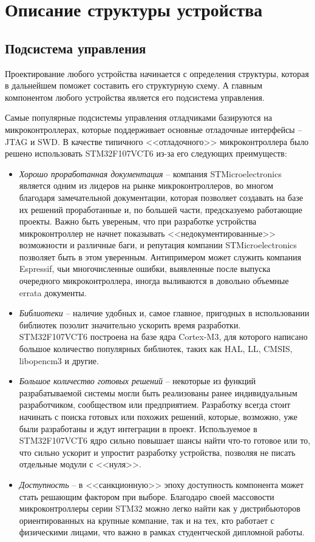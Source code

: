 
\chapter{Описание структуры устройства}
\section{Подсистема управления}
\hspace{1cm} 

Проектирование любого устройства начинается с определения структуры, которая в дальнейшем
поможет составить его структурную схему. А главным компонентом любого устройства является
его подсистема управления.

Самые популярные подсистемы управления отладчиками базируются на микроконтроллерах,
которые поддерживает основные отладочные интерфейсы -- JTAG и SWD.
В качестве типичного <<отладочного>> микроконтроллера было решено использовать
STM32F107VCT6 из-за его следующих преимуществ:

\begin{itemize}
    \item \textit{Хорошо проработанная документация} -- компания
     STMicroelectronics является одним из лидеров на рынке микроконтроллеров, во многом благодаря
     замечательной документации, которая позволяет создавать на базе их решений проработанные
     и, по большей части, предсказуемо работающие проекты. Важно быть увереным, что при разработке
     устройства микроконтроллер не начнет показывать <<недокументированные>> возможности и
     различные баги, и репутация компании STMicroelectronics позволяет быть в этом
     уверенным. Антипримером может служить компания Espressif, чьи многочисленные ошибки,
     выявленные после выпуска очередного микроконтроллера, иногда выливаются в довольно
     объемные errata документы.
    \item \textit{Библиотеки} -- наличие удобных и, самое главное, пригодных в использовании 
     библиотек позолит значительно ускорить время разработки. STM32F107VCT6 построена на базе
     ядра Cortex-M3, для которого написано большое количество популярных библиотек, таких
     как HAL, LL, CMSIS, libopencm3 и другие.
    \item \textit{Большое количество готовых решений} -- некоторые из функций разрабатываемой
     системы могли быть реализованы ранее индивидуальным разработчиком, 
     сообществом или предприятием. Разработку всегда стоит начинать с поиска готовых или похожих 
     решений, которые, возможно, уже были разработаны и ждут интеграции в проект. Используемое
     в STM32F107VCT6 ядро сильно повышает шансы найти что-то готовое или то, что сильно 
     ускорит и упростит разработку устройства, позволяя не писать отдельные модули с <<нуля>>.
     \cite{Lakamera:embed}
    \item \textit{Доступность} -- в <<санкционную>> эпоху доступность компонента может стать 
     решающим фактором при выборе. Благодаро своей массовости микроконтроллеры серии STM32 
     можно легко найти как у дистрибьюторов ориентированных на крупные компание, так и на тех,
     кто работает с физическими лицами, что важно в рамках студентческой дипломной работы.
\end{itemize}

